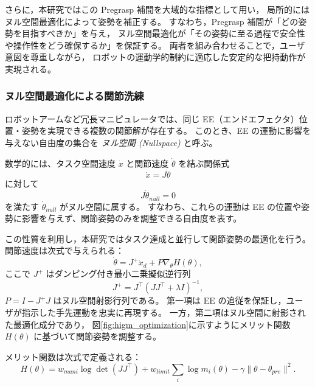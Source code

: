 \documentclass[../../main.tex]{subfiles} %
\begin{document}
さらに，本研究ではこの Pregrasp 補間を大域的な指標として用い，
局所的にはヌル空間最適化\cite{Null1}\cite{Null2}によって姿勢を補正する。
すなわち，Pregrasp 補間が「どの姿勢を目指すべきか」を与え，
ヌル空間最適化が「その姿勢に至る過程で安全性や操作性をどう確保するか」を保証する。
両者を組み合わせることで，ユーザ意図を尊重しながら，
ロボットの運動学的制約に適応した安定的な把持動作が実現される。


\subsubsection{ヌル空間最適化による関節洗練}
ロボットアームなど冗長マニピュレータでは、同じ EE（エンドエフェクタ）位置・姿勢を実現できる複数の関節解が存在する。
このとき、EE の運動に影響を与えない自由度の集合を \textit{ヌル空間 (Nullspace)} と呼ぶ\cite{Null1}\cite{Null2}。

数学的には、タスク空間速度 $\dot{x}$ と関節速度 $\dot{\theta}$ を結ぶ関係式
\begin{equation}
\dot{x} = J \dot{\theta}
\end{equation}
に対して
\begin{equation}
J \dot{\theta}_{null} = 0
\end{equation}
を満たす $\dot{\theta}_{null}$ がヌル空間に属する。
すなわち、これらの運動は EE の位置や姿勢に影響を与えず、関節姿勢のみを調整できる自由度を表す。

この性質を利用し，本研究ではタスク達成と並行して関節姿勢の最適化を行う。
関節速度は次式で与えられる：
\begin{equation}
\dot{\theta} = J^+ \dot{x}_d + P \nabla_\theta H(\theta),
\end{equation}
ここで $J^+$ はダンピング付き最小二乗擬似逆行列
\begin{equation}
J^+ = J^\top (JJ^\top + \lambda I)^{-1},
\end{equation}
$P = I - J^+ J$ はヌル空間射影行列である。
第一項は EE の追従を保証し，ユーザが指示した手先運動を忠実に再現する。
一方，第二項はヌル空間に射影された最適化成分であり，
図\ref{fig:higm_optimization}に示すようにメリット関数 $H(\theta)$ に基づいて関節姿勢を調整する。

メリット関数は次式で定義される：
\begin{equation}
H(\theta) = w_{mani}\log\det(JJ^\top) + w_{limit}\sum_i \log m_i(\theta) - \gamma\|\theta-\theta_{pre}\|^2.
\end{equation}
\end{document}
